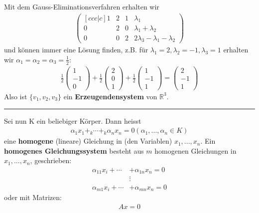 \documentclass[11pt]{report}
\newcommand*\Zb[1] {\mathbb{#1}}
\newcommand*\f[1] {\textbf{#1}}
\begin{document}
Mit dem Gauss-Eliminationsverfahren erhalten wir
\begin{align}
 \begin{pmatrix}[ccc|c] 1  & 2 & 1 & \lambda_1\\ 0 & 2 & 0 & \lambda_1 + \lambda_2\\ 0 & 0 & 2 & 2\lambda_3 - \lambda_1 - \lambda_2 \end{pmatrix}
\end{align}
und können immer eine Lösung finden, z.B. für $\lambda_1 = 2, \lambda_2 = -1, \lambda_3 = 1$ erhalten wir $\alpha_1 = \alpha_2 = \alpha_3 = \frac{1}{2}$:
\begin{align}
 \frac{1}{2} \begin{pmatrix} 1 \\ -1 \\ 0 \end{pmatrix} + \frac{1}{2} \begin{pmatrix} 2 \\ 0 \\ 1 \end{pmatrix} + \frac{1}{2} \begin{pmatrix} 1 \\ -1 \\ 1 \end{pmatrix} = \begin{pmatrix} 2 \\ -1 \\ 1 \end{pmatrix}
\end{align}
Also ist $\{v_1, v_2, v_3\}$ ein \f{Erzeugendensystem} von $\Zb{R}^3$.
\\ \vspace*{0.2cm}\rule{\linewidth}{0.3mm}\vspace{0.2cm}
Sei nun K ein beliebiger Körper. Dann heisst
\begin{align}
 \alpha_1 x_1 +_k \cdots +_k \alpha_n x_n = 0 (\alpha_1, ..., \alpha_n \in K)
\end{align}
eine \f{homogene} (lineare) Gleichung in (den Variablen) $x_1, ..., x_n$. Ein \f{homogenes Gleichungssystem} besteht aus $m$ homogenen Gleichungen in $x_1, ..., x_n$, geschrieben:
\begin{align}
 \alpha_{11} x_i + \cdots &+ \alpha_{1n} x_n = 0 \\
 & \vdots \\
\alpha_{m1} x_i + \cdots &+ \alpha_{mn} x_n = 0  
\end{align}
oder mit Matrizen:
\begin{align}
 Ax = 0
\end{align}
\end{document}
